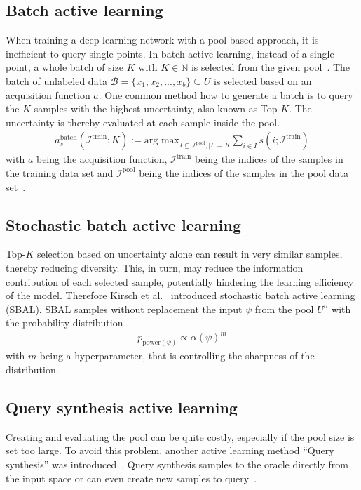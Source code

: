 \subsection{Batch active learning}
When training a deep-learning network with a pool-based approach, 
it is inefficient to query single points. 
In batch active learning, instead of a single point, 
a whole batch of size $K$ with $K\in\mathbb{N}$  
is selected from the given pool~\cite{ren2021survey}. 
The batch of unlabeled data 
$\mathcal{B} = \{x_1,x_2,...,x_b\}\subseteq U$ 
is selected based on an acquisition function $a$.
One common method how to generate a batch is to query the $K$ samples with the highest uncertainty, also known as Top-$K$.
The uncertainty is thereby evaluated at each sample inside the pool.
\begin{align}
a_s^{\text{batch}}(\mathcal{I}^{\text{train}};K) := \text{arg max}_{I\subseteq\mathcal{I}^{\text{pool}},\lvert I\rvert = K}\sum_{i\in I}s(i;\mathcal{I}^{\text{train}})
\end{align}    
with $a$ being the acquisition function, 
$\mathcal{I}^{\text{train}}$ being the indices of the samples 
in the training data set and $\mathcal{I}^{\text{pool}}$ being the indices 
of the samples in the pool data set~\cite{kirsch2021stochastic}.
\subsection{Stochastic batch active learning}
Top-$K$ selection based on uncertainty alone can result in very similar samples, thereby reducing diversity. This, in turn, may reduce the information contribution of each selected sample, potentially hindering the learning efficiency of the model.
Therefore Kirsch et al.~\cite{kirsch2021stochastic} introduced stochastic batch 
active learning (SBAL). SBAL samples without replacement the input 
$\psi$ from the pool $U^n$ with the probability distribution 
\begin{align}
    p_{\text{power}(\psi)}\propto\alpha(\psi)^m
\end{align} 
with $m$ being a 
hyperparameter, that is controlling the sharpness of the distribution. 


\subsection{Query synthesis active learning}
Creating and evaluating the pool can be quite costly, especially if the pool size is set too large. To avoid 
this problem, another active learning method ``Query synthesis'' was introduced~\cite{Angluin1988}. 
Query synthesis samples to the oracle directly from the input space or can even create new samples to query~\cite{wang2015active}.

